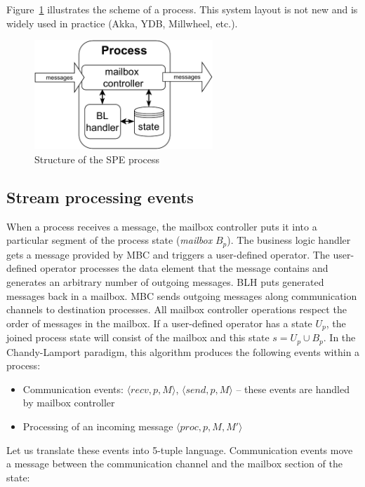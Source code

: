 Figure~\ref{fig:spe_process} illustrates the scheme of a process. This system layout is not new and is widely used in practice (Akka, YDB, Millwheel, etc.).

\begin{figure}[t]
  \centering
  \includegraphics[width=0.6\textwidth]{Chapters/SubstreamConsistency/pics/process-scheme.pdf}
  \caption{Structure of the SPE process}
  \label{fig:spe_process}
\end{figure}

\subsection{Stream processing events}

When a process receives a message, the mailbox controller puts it into a particular segment of the process state ({\em mailbox} $B_p$). The business logic handler gets a message provided by MBC and triggers a user-defined operator. The user-defined operator processes the data element that the message contains and generates an arbitrary number of outgoing messages. BLH puts generated messages back in a mailbox. MBC sends outgoing messages along communication channels to destination processes. All mailbox controller operations respect the order of messages in the mailbox. If a user-defined operator has a state $U_p$, the joined process state will consist of the mailbox and this state $s=U_p \cup B_p$. In the Chandy-Lamport paradigm, this algorithm produces the following events within a process:
\begin{itemize}
    \item Communication events: $\langle recv, p, M\rangle$, $\langle send, p, M \rangle$ -- these events are handled by mailbox controller
    \item Processing of an incoming message $\langle proc, p, M, M' \rangle$
\end{itemize}

Let us translate these events into 5-tuple language. Communication events move a message between the communication channel and the mailbox section of the state:

